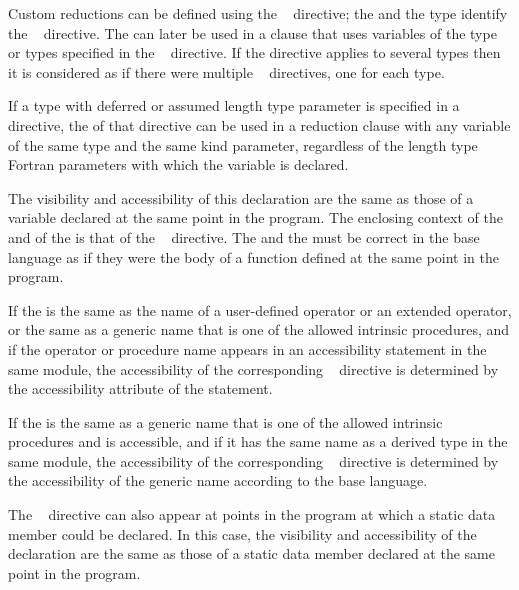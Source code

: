 \descr
Custom reductions can be defined using the ~ 
directive; the  and the type identify the 
~ directive. The  can 
later be used in a  clause that uses variables of the type or types 
specified in the ~ directive. If the directive 
applies to several types then it is considered as if there were multiple 
~ directives, one for each type.

\begin{fortranspecific}
If a type with deferred or assumed length type parameter is specified in a 
~ directive, the  
of that directive can be used in a reduction clause with any variable of 
the same type and the same kind parameter, regardless of the length type 
Fortran parameters with which the variable is declared.
\end{fortranspecific}

The visibility and accessibility of this declaration are the same as those 
of a variable declared at the same point in the program. The enclosing context 
of the  and of the  is that of the 
~ directive. The  and the 
 must be correct in the base language as if they were 
the body of a function defined at the same point in the program.

\begin{fortranspecific}
If the  is the same as the name of a user-defined 
operator or an extended operator, or the same as a generic name that is one 
of the allowed intrinsic procedures, and if the operator or procedure name 
appears in an accessibility statement in the same module, the accessibility 
of the corresponding ~ directive is determined 
by the accessibility attribute of the statement.

If the  is the same as a generic name that is one 
of the allowed intrinsic procedures and is accessible, and if it has the same 
name as a derived type in the same module, the accessibility of the corresponding 
~ directive is determined by the accessibility 
of the generic name according to the base language.
\end{fortranspecific}

\begin{cppspecific}
The ~ directive can also appear at points in the 
program at which a static data member could be declared. In this case, the 
visibility and accessibility of the declaration are the same as those of a 
static data member declared at the same point in the program.
\end{cppspecific}

